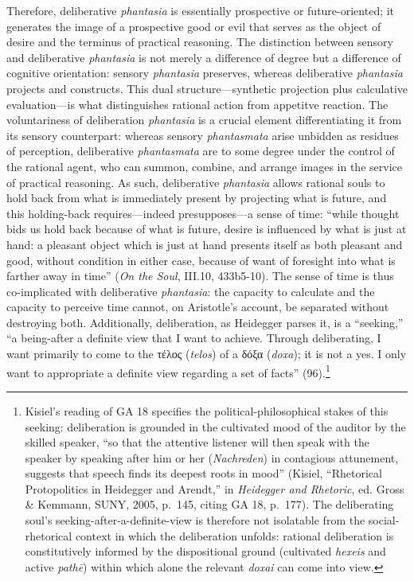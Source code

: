 \documentclass{article}
\newcommand{\gk}[1]{{\greekfont #1}}
\begin{document}
Therefore, deliberative \textit{phantasia} is essentially prospective or future-oriented; it generates the image of a prospective good or evil that serves as the object of desire and the terminus of practical reasoning. The distinction between sensory and deliberative \textit{phantasia} is not merely a difference of degree but a difference of cognitive orientation: sensory \textit{phantasia} preserves, whereas deliberative \textit{phantasia} projects and constructs. This dual structure---synthetic projection plus calculative evaluation---is what distinguishes rational action from appetitve reaction. The voluntariness of deliberation \textit{phantasia} is a crucial element differentiating it from its sensory counterpart: whereas sensory \textit{phantasmata} arise unbidden as residues of perception, deliberative \textit{phantasmata} are to some degree under the control of the rational agent, who can summon, combine, and arrange images in the service of practical reasoning. As such, deliberative \textit{phantasia} allows rational souls to hold back from what is immediately present by projecting what is future, and this holding-back requires---indeed presupposes---a sense of time: ``while thought bids us hold back because of what is future, desire is influenced by what is just at hand: a pleasant object which is just at hand presents itself as both pleasant and good, without condition in either case, because of want of foresight into what is farther away in time'' (\textit{On the Soul}, III.10, 433b5-10). The sense of time is thus co-implicated with deliberative \textit{phantasia}: the capacity to calculate and the capacity to perceive time cannot, on Aristotle's account, be separated without destroying both. Additionally, deliberation, as Heidegger parses it, is a ``seeking,'' ``a being-after a definite view that I want to achieve. Through deliberating, I want primarily to come to the \gk{τέλος} (\textit{telos}) of a \gk{δόξα} (\textit{doxa}); it is not a yes. I only want to appropriate a definite view regarding a set of facts'' (96).\footnote{Kisiel's reading of GA 18 specifies the political-philosophical stakes of this seeking: deliberation is grounded in the cultivated mood of the auditor by the skilled speaker, ``so that the attentive listener will then speak with the speaker by speaking after him or her (\textit{Nachreden}) in contagious attunement, suggests that speech finds its deepest roots in mood'' (Kisiel, ``Rhetorical Protopolitics in Heidegger and Arendt,'' in \textit{Heidegger and Rhetoric}, ed. Gross \& Kemmann, SUNY, 2005, p.~145, citing GA 18, p.~177). The deliberating soul's seeking-after-a-definite-view is therefore not isolatable from the social-rhetorical context in which the deliberation unfolds: rational deliberation is constitutively informed by the dispositional ground (cultivated \textit{hexeis} and active \textit{pathē}) within which alone the relevant \textit{doxai} can come into view.}
\end{document}
